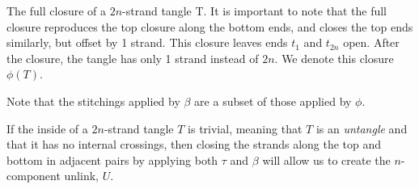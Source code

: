 \begin{paper}
{The full closure of a $2n$-strand tangle T.
It is important to note that the full closure reproduces the top closure along
the bottom ends, and closes the top ends similarly, but offset by 1 strand.
This closure leaves ends $t_1$ and $t_{2n}$ open.
After the closure, the tangle has only 1 strand instead of $2n$.
We denote this closure $\phi(T)$.}


Note that the stitchings applied by $\beta$ are a subset of those applied by
$\phi$.

If the inside of a $2n$-strand tangle $T$ is trivial, meaning that $T$ is an
\textit{untangle} and that it has no internal crossings, then closing the
strands along the top and bottom in adjacent pairs by applying both $\tau$ and
$\beta$ will allow us to create the $n$-component unlink, $U$.

\begin{paperwhere}
\end{paperwhere}


\end{paper}
